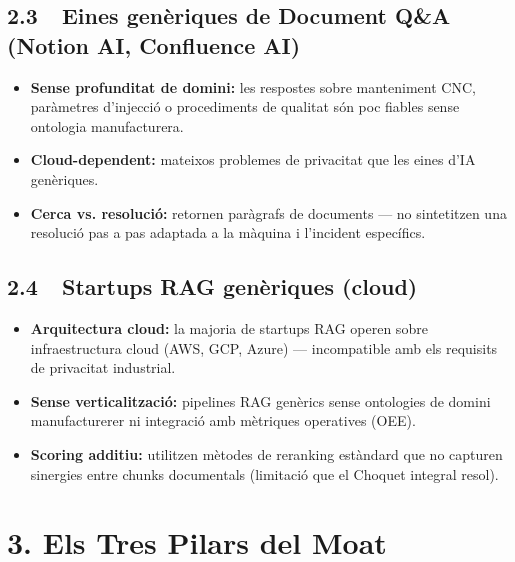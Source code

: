 \documentclass[11pt,a4paper]{article}
\begin{document}
\subsection{2.3~~Eines genèriques de Document Q\&A (Notion AI, Confluence AI)}

\begin{itemize}[leftmargin=1.5em,itemsep=2pt]
\item \textbf{Sense profunditat de domini:} les respostes sobre manteniment CNC, paràmetres d'injecció o procediments de qualitat són poc fiables sense ontologia manufacturera.
\item \textbf{Cloud-dependent:} mateixos problemes de privacitat que les eines d'IA genèriques.
\item \textbf{Cerca vs. resolució:} retornen paràgrafs de documents --- no sintetitzen una resolució pas a pas adaptada a la màquina i l'incident específics.
\end{itemize}

\subsection{2.4~~Startups RAG genèriques (cloud)}

\begin{itemize}[leftmargin=1.5em,itemsep=2pt]
\item \textbf{Arquitectura cloud:} la majoria de startups RAG operen sobre infraestructura cloud (AWS, GCP, Azure) --- incompatible amb els requisits de privacitat industrial.
\item \textbf{Sense verticalització:} pipelines RAG genèrics sense ontologies de domini manufacturerer ni integració amb mètriques operatives (OEE).
\item \textbf{Scoring additiu:} utilitzen mètodes de reranking estàndard que no capturen sinergies entre chunks documentals (limitació que el Choquet integral resol).
\end{itemize}

\section{3. Els Tres Pilars del Moat}
\end{document}
